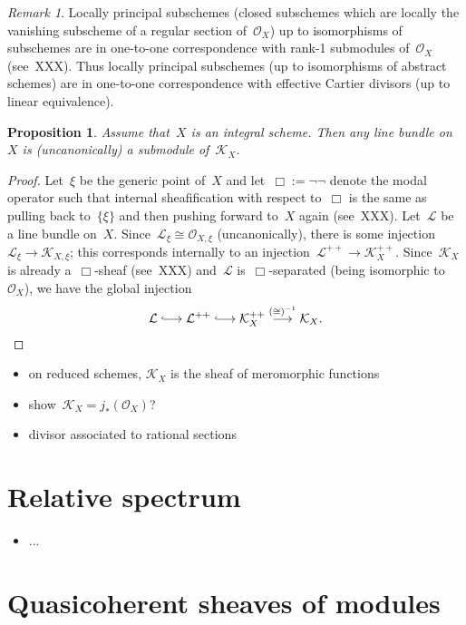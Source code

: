 \documentclass[10pt]{amsart}
\theoremstyle{definition}
\theoremstyle{plain}
\newtheorem{prop}[defn]{Proposition}
\theoremstyle{remark}
\newtheorem{rem}[defn]{Remark}
\renewcommand{\O}{\mathcal{O}}
\newcommand{\K}{\mathcal{K}}
\renewcommand{\L}{\mathcal{L}}
\newcommand{\?}{\,{:}\,}
\renewcommand{\_}{\mathpunct{.}\,}
\newcommand{\lhra}{\ensuremath{\lhook\joinrel\relbar\joinrel\rightarrow}}
\begin{document}
\begin{rem}Locally principal subschemes (closed subschemes which are locally
the vanishing subscheme of a regular section of~$\O_X$) up to isomorphisms of
subschemes are in one-to-one correspondence with rank-1 submodules of~$\O_X$
(see~XXX). Thus locally principal subschemes (up to isomorphisms of abstract
schemes) are in one-to-one correspondence with effective Cartier divisors (up
to linear equivalence).\end{rem}

\begin{prop}Assume that~$X$ is an integral scheme. Then any line bundle on~$X$
is (uncanonically) a submodule of~$\K_X$.\end{prop}
\begin{proof}Let~$\xi$ be the generic point of~$X$ and let~$\Box := \neg\neg$
denote the modal operator such that internal sheafification with respect
to~$\Box$ is the same as pulling back to~$\{\xi\}$ and then pushing forward
to~$X$ again (see~XXX). Let~$\L$ be a line bundle on~$X$. Since~$\L_\xi \cong
\O_{X,\xi}$ (uncanonically), there is some injection~$\L_\xi \to \K_{X,\xi}$;
this corresponds internally to an injection~$\L^{++} \to \K_X^{++}$.
Since~$\K_X$ is already a~$\Box$-sheaf (see~XXX) and~$\L$ is~$\Box$-separated
(being isomorphic to~$\O_X$), we have the global injection
\[ \L \lhra \L^{++} \lhra \K_X^{++} \stackrel{({\cong})^{-1}}{\longrightarrow} \K_X. \qedhere \]
\end{proof}

\begin{itemize}
\item on reduced schemes, $\K_X$ is the sheaf of meromorphic functions
\item show~$\K_X = j_*(\O_X)$?
\item divisor associated to rational sections
\end{itemize}


\section{Relative spectrum}
\begin{itemize}
\item ...
\end{itemize}


\section{Quasicoherent sheaves of modules}
\end{document}
